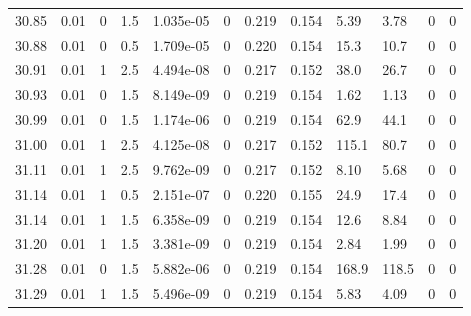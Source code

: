 \documentclass[preview]{standalone}
\begin{document}
{{{{{{{{{{{{{{\begin{tabular}{L{1.2cm}C{1.2cm} C{0.3cm}C{0.5cm} C{1.4cm}C{1.4cm} C{1.4cm}C{1.4cm} C{1.6cm}C{1.6cm} C{1.6cm}C{1.6cm}}
  30.85  &  0.01  & 0     & 1.5 &  1.035e-05  & 0  &  0.219&   0.154& 5.39 & 3.78   &  0 & 0  \\ 
  30.88  &  0.01  & 0     & 0.5 &  1.709e-05  & 0  &  0.220&   0.154& 15.3 & 10.7   &  0 & 0  \\ 
  30.91  &  0.01  & 1     & 2.5 &  4.494e-08  & 0  &  0.217&   0.152& 38.0 & 26.7   &  0 & 0  \\ 
  30.93  &  0.01  & 0     & 1.5 &  8.149e-09  & 0  &  0.219&   0.154& 1.62 & 1.13   &  0 & 0  \\ 
  30.99  &  0.01  & 0     & 1.5 &  1.174e-06  & 0  &  0.219&   0.154& 62.9 & 44.1   &  0 & 0  \\ 
  31.00  &  0.01  & 1     & 2.5 &  4.125e-08  & 0  &  0.217&   0.152& 115.1 & 80.7   &  0 & 0  \\ 
  31.11  &  0.01  & 1     & 2.5 &  9.762e-09  & 0  &  0.217&   0.152& 8.10 & 5.68   &  0 & 0  \\ 
  31.14  &  0.01  & 1     & 0.5 &  2.151e-07  & 0  &  0.220&   0.155& 24.9 & 17.4   &  0 & 0  \\ 
  31.14  &  0.01  & 1     & 1.5 &  6.358e-09  & 0  &  0.219&   0.154& 12.6 & 8.84   &  0 & 0  \\ 
  31.20  &  0.01  & 1     & 1.5 &  3.381e-09  & 0  &  0.219&   0.154& 2.84 & 1.99   &  0 & 0  \\ 
  31.28  &  0.01  & 0     & 1.5 &  5.882e-06  & 0  &  0.219&   0.154& 168.9 & 118.5   &  0 & 0  \\ 
  31.29  &  0.01  & 1     & 1.5 &  5.496e-09  & 0  &  0.219&   0.154& 5.83 & 4.09   &  0 & 0  \\ 
\hline 
\end{tabular} 

}}}}}}}}}}}}}}
\end{document}

